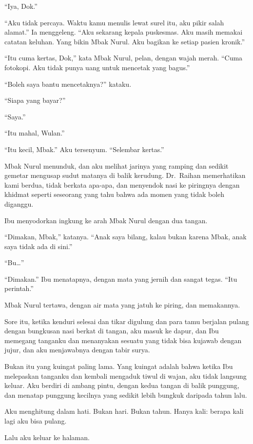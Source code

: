 \documentclass[11pt,twoside,openany]{book}
\makeatletter
\newcommand{\scenebreak}{\par\vspace{0.9em}{\centering\textsc{*\hspace{0.7em}*\hspace{0.7em}*}\par}\vspace{0.9em}\@afterindentfalse\@afterheading}
\makeatother
\begin{document}
``Iya, Dok.''

``Aku tidak percaya. Waktu kamu menulis lewat surel itu, aku pikir salah alamat.'' Ia menggeleng. ``Aku sekarang kepala puskesmas. Aku masih memakai catatan keluhan. Yang bikin Mbak Nurul. Aku bagikan ke setiap pasien kronik.''

``Itu cuma kertas, Dok,'' kata Mbak Nurul, pelan, dengan wajah merah. ``Cuma fotokopi. Aku tidak punya uang untuk mencetak yang bagus.''

``Boleh saya bantu mencetaknya?'' kataku.

``Siapa yang bayar?''

``Saya.''

``Itu mahal, Wulan.''

``Itu kecil, Mbak.'' Aku tersenyum. ``Selembar kertas.''

Mbak Nurul menunduk, dan aku melihat jarinya yang ramping dan sedikit gemetar mengusap sudut matanya di balik kerudung. Dr.~Raihan memerhatikan kami berdua, tidak berkata apa-apa, dan menyendok nasi ke piringnya dengan khidmat seperti seseorang yang tahu bahwa ada momen yang tidak boleh diganggu.

Ibu menyodorkan ingkung ke arah Mbak Nurul dengan dua tangan.

``Dimakan, Mbak,'' katanya. ``Anak saya bilang, kalau bukan karena Mbak, anak saya tidak ada di sini.''

``Bu\ldots{}''

``Dimakan.'' Ibu menatapnya, dengan mata yang jernih dan sangat tegas. ``Itu perintah.''

Mbak Nurul tertawa, dengan air mata yang jatuh ke piring, dan memakannya.

\scenebreak
Sore itu, ketika kenduri selesai dan tikar digulung dan para tamu berjalan pulang dengan bungkusan nasi berkat di tangan, aku masuk ke dapur, dan Ibu memegang tanganku dan menanyakan sesuatu yang tidak bisa kujawab dengan jujur, dan aku menjawabnya dengan tabir surya.

Bukan itu yang kuingat paling lama. Yang kuingat adalah bahwa ketika Ibu melepaskan tanganku dan kembali mengaduk tiwul di wajan, aku tidak langsung keluar. Aku berdiri di ambang pintu, dengan kedua tangan di balik punggung, dan menatap punggung kecilnya yang sedikit lebih bungkuk daripada tahun lalu.

Aku menghitung dalam hati. Bukan hari. Bukan tahun. Hanya kali: berapa kali lagi aku bisa pulang.

Lalu aku keluar ke halaman.
\end{document}
